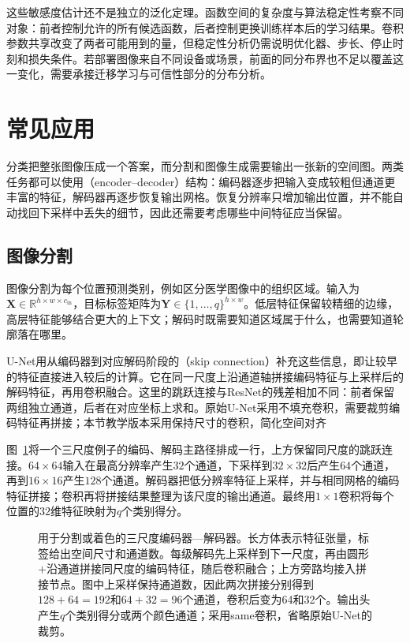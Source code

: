 这些敏感度估计还不是独立的泛化定理。函数空间的复杂度与算法稳定性考察不同对象：前者控制允许的所有候选函数，后者控制更换训练样本后的学习结果。卷积参数共享改变了两者可能用到的量，但稳定性分析仍需说明优化器、步长、停止时刻和损失条件。若部署图像来自不同设备或场景，前面的同分布界也不足以覆盖这一变化，需要承接迁移学习与可信性部分的分布分析。

\section{常见应用}
\label{sec:cnn-applications}

分类把整张图像压成一个答案，而分割和图像生成需要输出一张新的空间图。两类任务都可以使用（encoder--decoder）结构：编码器逐步把输入变成较粗但通道更丰富的特征，解码器再逐步恢复输出网格。恢复分辨率只增加输出位置，并不能自动找回下采样中丢失的细节，因此还需要考虑哪些中间特征应当保留。

\subsection{图像分割}
\label{sec:cnn-segmentation}

图像分割为每个位置预测类别，例如区分医学图像中的组织区域。输入为$\bm X\in\mathbb R^{h\times w\times c_{\mathrm{in}}}$，目标标签矩阵为$\bm Y\in\{1,\ldots,q\}^{h\times w}$。低层特征保留较精细的边缘，高层特征能够结合更大的上下文；解码时既需要知道区域属于什么，也需要知道轮廓落在哪里。

U-Net用从编码器到对应解码阶段的（skip connection）补充这些信息，即让较早的特征直接进入较后的计算。它在同一尺度上沿通道轴拼接编码特征与上采样后的解码特征，再用卷积融合。这里的跳跃连接与ResNet的残差相加不同：前者保留两组独立通道，后者在对应坐标上求和。原始U-Net采用不填充卷积，需要裁剪编码特征再拼接；本节教学版本采用保持尺寸的卷积，简化空间对齐

图~\ref{fig:cnn-encoder-decoder}将一个三尺度例子的编码、解码主路径排成一行，上方保留同尺度的跳跃连接。$64\times64$输入在最高分辨率产生$32$个通道，下采样到$32\times32$后产生$64$个通道，再到$16\times16$产生$128$个通道。解码器把低分辨率特征上采样，并与相同网格的编码特征拼接；卷积再将拼接结果整理为该尺度的输出通道。最终用$1\times1$卷积将每个位置的$32$维特征映射为$q$个类别得分。

\begin{figure}[htb]
  \centering
  
  \caption{用于分割或着色的三尺度编码器—解码器。长方体表示特征张量，标签给出空间尺寸和通道数。每级解码先上采样到下一尺度，再由圆形$+$沿通道拼接同尺度的编码特征，随后卷积融合；上方旁路均接入拼接节点。图中上采样保持通道数，因此两次拼接分别得到$128+64=192$和$64+32=96$个通道，卷积后变为64和32个。输出头产生$q$个类别得分或两个颜色通道；采用same卷积，省略原始U-Net的裁剪。}
  \label{fig:cnn-encoder-decoder}
\end{figure}

